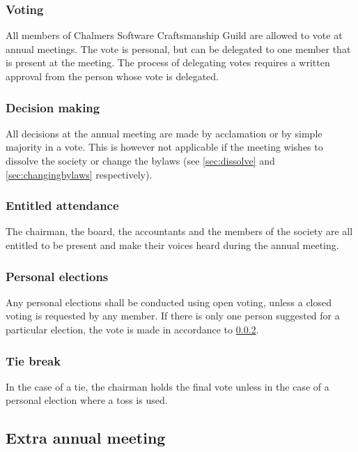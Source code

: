 \documentclass[a4paper]{article}
\newcommand{\name}{Chalmers Software Craftsmanship Guild}
\begin{document}
\subsubsection{Voting}

All members of \name{} are allowed to vote at annual meetings.
The vote is personal, but can be delegated to one member that is present at the
meeting. The process of delegating votes requires a written approval from the
person whose vote is delegated.

\subsubsection{Decision making}
\label{sec:annualdecision}

All decisions at the annual meeting are made by acclamation or
by simple majority in a vote. This is however not applicable if the meeting wishes to
dissolve the society or change the bylaws (see \ref{sec:dissolve} and \ref{sec:changingbylaws} respectively).

\subsubsection{Entitled attendance}

The chairman, the board, the accountants and the members of
the society are all entitled to be present and make their voices heard during
the annual meeting.

\subsubsection{Personal elections}

Any personal elections shall be conducted using open voting,
unless a closed voting is requested by any member. If there is only
one person suggested for a particular election, the vote is made in accordance
to \ref{sec:annualdecision}.

\subsubsection{Tie break}

In the case of a tie, the chairman holds the final vote
unless in the case of a personal election where a toss is used.

\subsection{Extra annual meeting}
\end{document}
